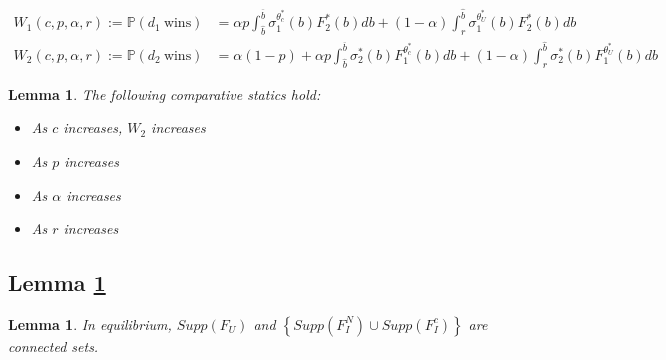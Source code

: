 \documentclass[11pt]{article}
\theoremstyle{plain}
\theoremstyle{definition}
\theoremstyle{plain}
\theoremstyle{plain}
\theoremstyle{plain}
\newtheorem{lem}[thm]{Lemma}
\theoremstyle{plain}
\numberwithin{equation}{section}
\begin{document}
\begin{align*}
 W_1 (c,p,\alpha, r) := \mathbb{P} (d_1 \ \text{wins}) &= \alpha p \int_{\hat{b}}^{\overline{b}} \sigma_1^{\theta_c^*}(b) F_2^*(b) db + (1 - \alpha) \int_{r}^{\hat{b}} \sigma_1^{\theta_U^*}(b) F_2^*(b) db \\[12pt]
 W_2 (c,p,\alpha, r) := \mathbb{P} (d_2 \ \text{wins}) &= \alpha (1 - p) + \alpha p \int_{\hat{b}}^{\overline{b}} \sigma_2^*(b) F_1^{\theta_c^*}(b) db + (1 - \alpha) \int_{r}^{\hat{b}} \sigma_2^*(b) F_1^{\theta_U^*}(b) db
\end{align*}

\vspace{0.2cm}

\begin{lem}
The following comparative statics hold:

\begin{itemize}
    \item[-] As $ c $ increases, $ W_2 $ increases

    \vspace{0.2cm}

    \item[-] As $ p $ increases

    \vspace{0.2cm}

    \item[-] As $ \alpha $ increases

    \vspace{0.2cm}

    \item[-] As $ r $ increases
\end{itemize}
\end{lem}

\subsection*{Lemma \ref{connectedF_I}}
\begin{lem}\label{connectedF_I}
    In equilibrium, $Supp(F_U)$ and $ \left\{ Supp\left( F_I^N \right) \cup Supp\left( F_I^c \right)\right\}$ are connected sets.
\end{lem}
\vspace{1mm}
\end{document}
